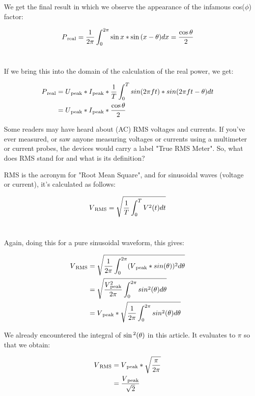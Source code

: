 \documentclass[a4paper]{article}
\def\SP#1{\textsuperscript{#1}}
\def\SB#1{\textsubscript{{#1}}}
\def\SPSB#1#2{\rlap{\textsuperscript{#1}}\SB{#2}}
\begin{document}
We get the final result in which we observe the appearance of
the infamous cos($\phi$) factor:

\begin{align*}
  P\SB{real} &=\frac{1}{2 \pi}\int_0^{2\pi}\sin{x} * \sin{(x - \theta)}dx = \frac{\cos{\theta}}{2}\\
\end{align*}\

If we bring this into the domain of the calculation of the real power,
we get:

\begin{align*}
  P\SB{real} &= U\SB{peak} * I\SB{peak} * \frac{1}{T} \int_0^{T}{sin(2\pi ft) * sin(2\pi ft - \theta)} dt\\
  &= U\SB{peak} * I\SB{peak} * \frac{\cos{\theta}}{2}\\
\end{align*}

Some readers may have heard about (AC) RMS voltages and currents. If
you've ever measured, or saw anyone measuring voltages or currents using a
multimeter or current probes, the devices would carry a label "True RMS
Meter". So, what does RMS stand for and what is its definition?

RMS is the acronym for "Root Mean Square",  and for sinusoidal waves (voltage
or current), it's calculated as follows:

\begin{align*}
  V\SB{RMS} &= \sqrt{\frac{1}{T} \int_0^{T} V\SP{2}(t) dt}\\
\end{align*}\

Again, doing this for a pure sinusoidal waveform, this gives:

\begin{align*}
  V\SB{RMS} &= \sqrt{\frac{1}{2 \pi} \int_0^{2 \pi} (V\SB{peak} * sin(\theta))\SP{2} d\theta}\\
  &= \sqrt{\frac{V\SPSB{2}{peak}}{2 \pi} \int_0^{2 \pi} sin\SP{2}(\theta) d\theta}\\
  &= V\SB{peak} * \sqrt{\frac{1}{2 \pi} \int_0^{2 \pi} sin\SP{2}(\theta) d\theta}\\
\end{align*}

We already encountered the integral of $\sin\SP{2}(\theta)$ in this article.
It evaluates to $\pi$ so that we obtain:

\begin{align*}
  V\SB{RMS} &= V\SB{peak} * \sqrt{\frac{\pi}{2 \pi}}\\
  &= \frac{V\SB{peak}}{\sqrt{2}}\\
\end{align*}
\end{document}
